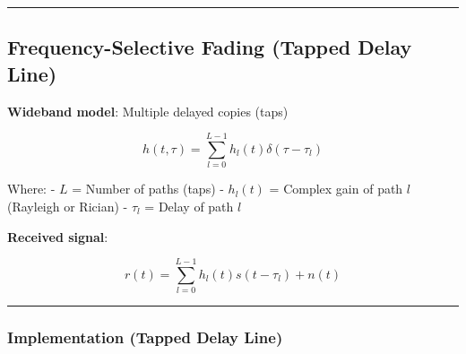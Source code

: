 \begin{center}\rule{0.5\linewidth}{0.5pt}\end{center}

\subsection{Frequency-Selective Fading (Tapped Delay
Line)}\label{frequency-selective-fading-tapped-delay-line}

\textbf{Wideband model}: Multiple delayed copies (taps)

\[
h(t, \tau) = \sum_{l=0}^{L-1} h_l(t) \delta(\tau - \tau_l)
\]

Where: - \(L\) = Number of paths (taps) - \(h_l(t)\) = Complex gain of
path \(l\) (Rayleigh or Rician) - \(\tau_l\) = Delay of path \(l\)

\textbf{Received signal}:

\[
r(t) = \sum_{l=0}^{L-1} h_l(t) s(t - \tau_l) + n(t)
\]

\begin{center}\rule{0.5\linewidth}{0.5pt}\end{center}

\subsubsection{Implementation (Tapped Delay
Line)}\label{implementation-tapped-delay-line}

